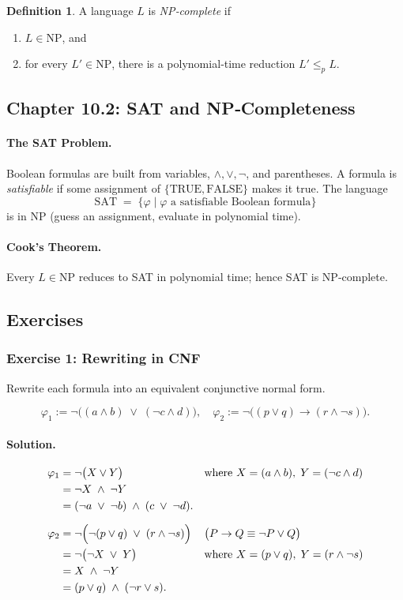 \documentclass{article}
\theoremstyle{theorem}
\theoremstyle{definition}
\newtheorem{definition}[theorem]{Definition}
\theoremstyle{remark}
\begin{document}
\begin{definition}
A language \(L\) is \emph{NP‐complete} if
\begin{enumerate}
  \item \(L\in\mathrm{NP}\), and
  \item for every \(L'\in\mathrm{NP}\), there is a polynomial‐time reduction
    \(L'\le_p L\).
\end{enumerate}
\end{definition}

\subsection{Chapter 10.2: SAT and NP‐Completeness}\label{sec:chapter10.2}
\paragraph{The SAT Problem.}  Boolean formulas are built from variables,
\(\land,\lor,\lnot\), and parentheses.  A formula is \emph{satisfiable} if
some assignment of \(\{\mathrm{TRUE},\mathrm{FALSE}\}\) makes it true.
The language
\[
  \mathrm{SAT}
  \;=\;
  \bigl\{\varphi\mid \varphi\text{ a satisfiable Boolean formula}\bigr\}
\]
is in \(\mathrm{NP}\) (guess an assignment, evaluate in polynomial time).
\paragraph{Cook’s Theorem.}  Every \(L\in\mathrm{NP}\) reduces to SAT in
polynomial time; hence SAT is NP‐complete.

\subsection{Exercises}\label{sec:week8-9-exercises}

\subsubsection{Exercise 1: Rewriting in CNF}  
Rewrite each formula into an equivalent conjunctive normal form.

\[
\varphi_1 := \neg\bigl((a\land b)\;\lor\;(\neg c\land d)\bigr),
\quad
\varphi_2 := \neg\bigl((p\lor q)\to(r\land\neg s)\bigr).
\]

\paragraph{Solution.}
\[
\begin{aligned}
\varphi_1 
&= \neg\bigl(X\lor Y\bigr)
  &&\text{where }X=(a\land b),\;Y=(\neg c\land d)\\
&= \neg X\;\land\;\neg Y\\
&= (\neg a\;\lor\;\neg b)\;\land\;(c\;\lor\;\neg d).
\\[6pt]
\varphi_2 
&= \neg\Bigl(\neg(p\lor q)\;\lor\;(r\land\neg s)\Bigr)
  &&\bigl(P\to Q\equiv\neg P\lor Q\bigr)\\
&= \neg\bigl(\neg X\;\lor\;Y\bigr)
  &&\text{where }X=(p\lor q),\;Y=(r\land\neg s)\\
&= X\;\land\;\neg Y\\
&= (p\lor q)\;\land\;(\neg r\lor s).
\end{aligned}
\]
\end{document}

